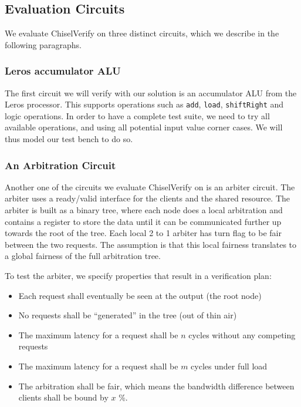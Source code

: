 \documentclass[conference]{IEEEtran}
\begin{document}
\subsection{Evaluation Circuits}
We evaluate ChiselVerify on three distinct circuits, which we describe in the following paragraphs.

\subsubsection{Leros accumulator ALU}

The first circuit we will verify with our solution is an accumulator ALU from the Leros processor.
This supports operations such as \texttt{add}, \texttt{load}, \texttt{shiftRight} and logic operations. 
In order to have a complete test suite, we need to try all available operations, and using all potential input value corner cases.
We will thus model our test bench to do so.

\subsubsection{An Arbitration Circuit}

Another one of the circuits we evaluate ChiselVerify on is an arbiter circuit.
The arbiter uses a ready/valid interface for the clients and the shared resource. 
The arbiter is built as a binary tree, where each node does a local arbitration
and contains a register to store the data until it can be communicated further up towards the root of the
tree. Each local 2 to 1 arbiter has turn flag to be fair between the two requests. The assumption is that
this local fairness translates to a global fairness of the full arbitration tree.

To test the arbiter, we specify properties that result in a verification plan:

\begin{itemize}
\item Each request shall eventually be seen at the output (the root node)
\item No requests shall be ``generated'' in the tree (out of thin air)
\item The maximum latency for a request shall be $n$ cycles without any competing requests
\item The maximum latency for a request shall be $m$ cycles under full load
\item The arbitration shall be fair, which means the bandwidth difference between clients shall be bound by $x$ \%.
\end{itemize}
\end{document}
